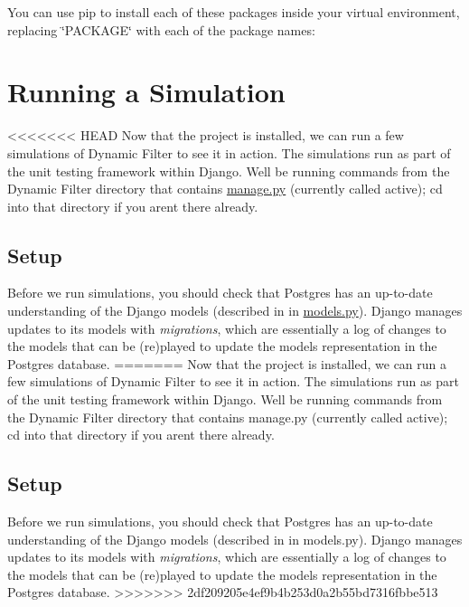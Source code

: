 \begin{DoxyVerb}
You can use {\ttfamily pip} to install each of these packages inside your virtual environment, replacing \char`\"{}\+P\+A\+C\+K\+A\+G\+E\char`\"{} with each of the package names\+: 
\hypertarget{install_info_running}{}\section{Running a Simulation}\label{install_info_running}
<<<<<<< HEAD
Now that the project is installed, we can run a few simulations of Dynamic Filter to see it in action. The simulations run as part of the unit testing framework within Django. We\textquotesingle{}ll be running commands from the Dynamic Filter directory that contains {\ttfamily \mbox{\hyperlink{manage_8py}{manage.\+py}}} (currently called {\ttfamily active}); {\ttfamily cd} into that directory if you aren\textquotesingle{}t there already.\hypertarget{install_info_simsetup}{}\subsection{Setup}\label{install_info_simsetup}
Before we run simulations, you should check that Postgres has an up-\/to-\/date understanding of the Django models (described in in {\ttfamily \mbox{\hyperlink{models_8py}{models.\+py}}}). Django manages updates to its models with {\itshape migrations}, which are essentially a log of changes to the models that can be (re)played to update the models\textquotesingle{} representation in the Postgres database.
=======
Now that the project is installed, we can run a few simulations of Dynamic Filter to see it in action. The simulations run as part of the unit testing framework within Django. We\textquotesingle{}ll be running commands from the Dynamic Filter directory that contains {\ttfamily manage.\+py} (currently called {\ttfamily active}); {\ttfamily cd} into that directory if you aren\textquotesingle{}t there already.\hypertarget{install_info_simsetup}{}\subsection{Setup}\label{install_info_simsetup}
Before we run simulations, you should check that Postgres has an up-\/to-\/date understanding of the Django models (described in in {\ttfamily models.\+py}). Django manages updates to its models with {\itshape migrations}, which are essentially a log of changes to the models that can be (re)played to update the models\textquotesingle{} representation in the Postgres database.
>>>>>>> 2df209205e4ef9b4b253d0a2b55bd7316fbbe513


\end{DoxyVerb}
